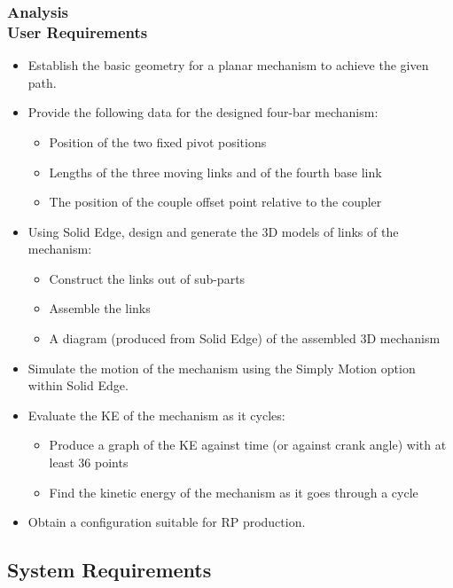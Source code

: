 \documentclass[ucs,10pt]{beamer}
\begin{document}
\begin{frame}
\frametitle{Analysis \\
    \small \color{rwth-blue} User Requirements}
    \begin{itemize}
        \item Establish the basic geometry for a planar mechanism to achieve the given path.
        \item Provide the following data for the designed four-bar mechanism:
        \begin{itemize}
            \item Position of the two fixed pivot positions
            \item Lengths of the three moving links and of the fourth base link
            \item The position of the couple offset point relative to the coupler
        \end{itemize}
        \item Using Solid Edge, design and generate the 3D models of links of the mechanism:
        \begin{itemize}
            \item Construct the links out of sub-parts
            \item Assemble the links
            \item A diagram (produced from Solid Edge) of the assembled 3D mechanism
        \end{itemize}
        \item Simulate the motion of the mechanism using the Simply Motion option within Solid Edge.
        \item Evaluate the KE of the mechanism as it cycles:
        \begin{itemize}
            \item Produce a graph of the KE against time (or against crank angle) with at least 36 points
            \item Find the kinetic energy of the mechanism as it goes through a cycle
        \end{itemize}
        \item Obtain a configuration suitable for RP production.
    \end{itemize}
\end{frame}



\subsection{System Requirements}
\end{document}
